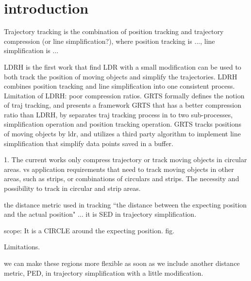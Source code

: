 

\section{introduction}
\label{sec-intro}


Trajectory tracking \cite{Lange:Tracking} is the combination of position tracking \cite{Wolfson:PositionTracking} and trajectory compression (or line simplification?), where position tracking is ..., line simplification is ...

LDRH is the first work that find LDR with a small modification can be used to both track the position of moving objects and simplify the trajectories. LDRH combines position tracking and line simplification into one consistent process. Limitation of LDRH: poor compression ratios. 
GRTS formally defines the notion of traj tracking, and presents a framework GRTS that has a better compression ratio than LDRH, by separates traj tracking process in to two sub-processes, simplification operation and position tracking operation. GRTS tracks positions of moving objects by ldr, and utilizes a third party algorithm to implement line simplification that simplify data points saved in a buffer.



1. The current works only compress trajectory or track moving objects in circular areas. vs application requirements that need to track moving objects in other areas, such as strips, or combinations of circulars and strips.
The necessity and possibility to track in circular and strip areas.

the distance metric used in tracking ``the distance between the expecting position and the actual position" ... it is SED in trajectory simplification. 

scope: It is  a CIRCLE around the expecting position. fig.

Limitations.

we can make these regions more flexible as soon as we include another distance metric, PED, in trajectory simplification with a little modification.


